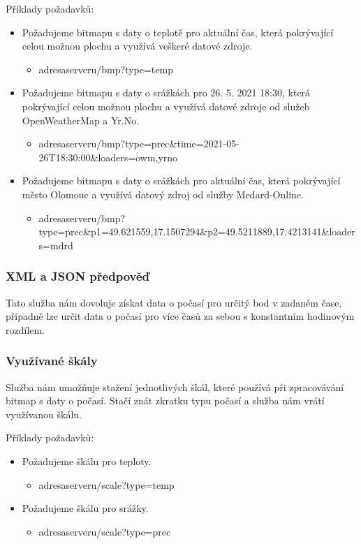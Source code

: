 \documentclass[czech,bachelor,dept460,male,csharp,cpdeclaration]{diploma}
\begin{document}
	Příklady požadavků:
	\begin{itemize}
		\item Požadujeme bitmapu s daty o teplotě pro aktuální čas, která pokrývající celou možnou plochu a využívá veškeré datové zdroje.
		\begin{itemize}
			\item adresaserveru/bmp?type=temp
		\end{itemize}
		\item Požadujeme bitmapu s daty o srážkách pro 26. 5. 2021 18:30, která pokrývající celou možnou plochu a využívá datové zdroje od služeb OpenWeatherMap a Yr.No.
		\begin{itemize}
			\item adresaserveru/bmp?type=prec\&time=2021-05-26T18:30:00\&loaders=owm,yrno
		\end{itemize}
		\item Požadujeme bitmapu s daty o srážkách pro aktuální čas, která pokrývající město Olomouc a využívá datový zdroj od služby Medard-Online.
		\begin{itemize}
			\item adresaserveru/bmp?type=prec\&p1=49.621559,17.1507294\&p2=49.5211889,17.4213141\&loaders=mdrd
		\end{itemize}
	\end{itemize}

	\subsubsection{XML a JSON předpověď}
	
	Tato služba nám dovoluje získat data o počasí pro určitý bod v zadaném čase, případně lze určit data o počasí pro více časů za sebou s konstantním hodinovým rozdílem.
	
	\subsubsection{Využívané škály}
	
	Služba nám umožňuje stažení jednotlivých škál, které používá při zpracovávání bitmap s daty o počasí. Stačí znát zkratku typu počasí a služba nám vrátí využívanou škálu.
	
	Příklady požadavků:
	\begin{itemize}
		\item Požadujeme škálu pro teploty.
		\begin{itemize}
			\item adresaserveru/scale?type=temp
		\end{itemize}
		\item Požadujeme škálu pro srážky.
		\begin{itemize}
			\item adresaserveru/scale?type=prec
		\end{itemize}
	\end{itemize}
	
\end{document}
